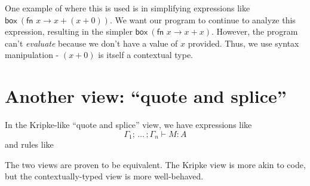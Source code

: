\documentclass[11pt]{article}
\newcommand{\BOX}[1]{\ensuremath{\textsf{box}~#1}}
\begin{document}
One example of where this is used is in simplifying expressions like $\BOX{(\textsf{fn } x \rightarrow x + (x + 0))}$. We want our program to continue to analyze this expression, resulting in the simpler $\BOX{(\textsf{fn } x \rightarrow x + x)}$. However, the program can't \textit{evaluate} because we don't have a value of $x$ provided. Thus, we use syntax manipulation - $(x+ 0)$ is itself a contextual type.

\section{Another view: ``quote and splice''}
In the Kripke-like ``quote and splice'' view, we have expressions like 
\[\Gamma_1; \, \ldots \, ; \Gamma_n \vdash M:A\]
and rules like
\\
\begin{minipage}{3in}
    \begin{mathpar}
    \end{mathpar}
\end{minipage}
\begin{minipage}{3in}
\begin{mathpar}
\end{mathpar}
\end{minipage}
The two views are proven to be equivalent. The Kripke view is more akin to code, but the contextually-typed view is more well-behaved.

\newpage
\printbibliography[heading=bibintoc]
\end{document}
